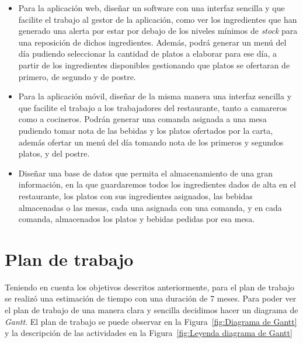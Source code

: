 \begin{itemize}

\item Para la aplicación web, diseñar un software con una interfaz sencilla y que facilite el trabajo al gestor de la aplicación, como ver los ingredientes que han generado una alerta por estar por debajo de los niveles mínimos de \textit{stock} para una reposición de dichos ingredientes. Además, podrá generar un menú del día pudiendo seleccionar la cantidad de platos a elaborar para ese día, a partir de los ingredientes disponibles gestionando que platos se ofertaran de primero, de segundo y de postre.

\item Para la aplicación móvil, diseñar de la misma manera una interfaz sencilla y que facilite el trabajo a los trabajadores del restaurante, tanto a camareros como a cocineros. Podrán generar una comanda asignada a una mesa pudiendo tomar nota de las bebidas y los platos ofertados por la carta, además ofertar un menú del día tomando nota de los primeros y segundos platos, y del postre.

\item Diseñar una base de datos que permita el almacenamiento de una gran información, en la que guardaremos todos los ingredientes dados de alta en el restaurante, los platos con sus ingredientes asignados, las bebidas almacenadas o las mesas, cada una asignada con una comanda, y en cada comanda, almacenados los platos y bebidas pedidas por esa mesa.

\end{itemize}

\section{Plan de trabajo}

Teniendo en cuenta los objetivos descritos anteriormente, para el plan de trabajo se realizó una  estimación de tiempo con una duración de 7 meses. Para poder ver el plan de trabajo de una manera clara y sencilla decidimos hacer un diagrama de \textit{Gantt}.
El plan de trabajo se puede observar en la Figura~\ref{fig:Diagrama de Gantt} y la descripción de las actividades en la Figura~\ref{fig:Leyenda diagrama de Gantt}

